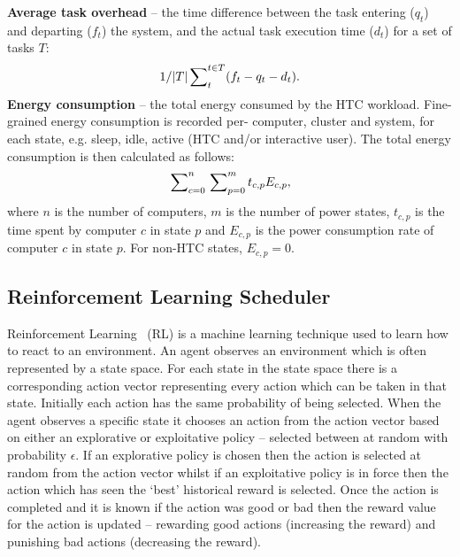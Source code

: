 \documentclass[10pt, conference, compsocconf]{IEEEtran}
\begin{document}
\textbf{Average task overhead} -- the time difference between the task entering ($q_t$) and departing ($f_t$) the system, and the actual task execution time ($d_t$) for a set of tasks $T$:%
\vskip -6pt
\begin{equation*}
1/|T|\sideset{}{^{t \in T}_{t}}\sum (f_{t} - q_{t} - d_{t}).
\end{equation*}
\vskip -3pt
\textbf{Energy consumption} -- the total energy consumed by the HTC workload. Fine-grained energy consumption is recorded per- computer, cluster and system, for each state, e.g. sleep, idle, active (HTC and/or interactive user). The total energy consumption is then calculated as follows:
\vskip -2pt
\begin{equation*} 
\sideset{}{^n_{c=0}}\sum \sideset{}{^m_{p=0}}\sum t_{c,p} E_{c,p},
\end{equation*}
\noindent where $n$ is the number of computers, $m$ is the number of power states, $t_{c,p}$ is the time spent by computer $c$ in state $p$ and $E_{c,p}$ is the power consumption rate of computer $c$ in state $p$. For non-HTC states, $E_{c,p} = 0$.
\subsection{Reinforcement Learning Scheduler}
Reinforcement Learning~\cite{rl} (RL) is a machine learning technique used to learn how to react to an environment. An agent observes an environment which is often represented by a state space. For each state in the state space there is a corresponding action vector representing every action which can be taken in that state. Initially each action has the same probability of being selected. When the agent observes a specific state it chooses an action from the action vector based on either an explorative or exploitative policy -- selected between at random with probability $\epsilon$. If an explorative policy is chosen then the action is selected at random from the action vector whilst if an exploitative policy is in force then the action which has seen the `best' historical reward is selected. Once the action is completed and it is known if the action was good or bad then the reward value for the action is updated -- rewarding good actions (increasing the reward) and punishing bad actions (decreasing the reward).
\end{document}
